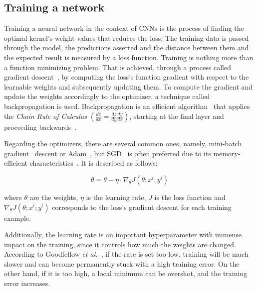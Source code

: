 \documentclass[class=report, crop=false, a4paper, 12pt]{standalone}
\begin{document}
\subsection{Training a network}
Training a neural network in the context of CNNs is the process of finding the optimal kernel's weight values that reduces the loss. The training data is passed through the model, the predictions asserted and the distance between them and the expected result is measured by a loss function. Training is nothing more than a function minimizing problem. That is achieved, through a process called gradient descent~\autocite{ruderOverviewGradientDescent}, by computing the loss's function gradient with respect to the learnable weights and subsequently updating them. To compute the gradient and update the weights accordingly to the optimizer, a technique called backpropagation is used. Backpropagation is an efficient algorithm~\autocite{6795724} that applies the \textit{Chain Rule of Calculus} $\left(\frac{dz}{dx} = \frac{dz}{dy}\frac{dy}{dx}\right)$, starting at the final layer and proceeding backwards~\autocite{Goodfellow-et-al-2016}.
\par Regarding the optimizers, there are several common ones, namely, mini-batch gradient~\autocite{ruderOverviewGradientDescent2017} descent or \gls{Adam}~\autocite{kingmaAdamMethodStochastic2015}, but \gls{SGD}~\autocite{alzubaidiReviewDeepLearning2021} is often preferred due to its memory-efficient characteristics~\autocite{ruderOverviewGradientDescent2017}. It is described as follows:

\begin{equation}
    \theta = \theta - \eta\cdot\nabla_{\theta}J\left(\theta;x^{i};y^{i}\right)
\end{equation}

\noindent where $\theta$ are the weights, $\eta$ is the learning rate, $J$ is the loss function and $\nabla_{\theta}J\left(\theta;x^{i};y^{i}\right)$ corresponds to the loss's gradient descent for each training example. 
\par Additionally, the learning rate is an important hyperparameter with immense impact on the training, since it controls how much the weights are changed. According to Goodfellow \textit{et al.}~\autocite{Goodfellow-et-al-2016}, if the rate is set too low, training will be much slower and can become permanently stuck with a high training error. On the other hand, if it is too high, a local minimum can be overshot, and the training error increases.
 

\label{transf learning}
\end{document}
